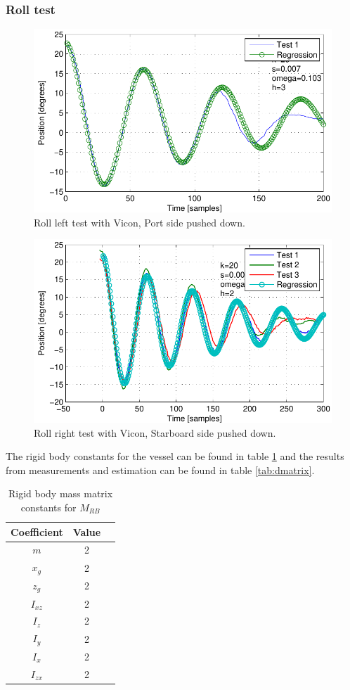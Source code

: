 \newpage
\subsubsection{Roll test}
\begin{figure}[H]
	\centering
	\includegraphics{plot/rltest}
	\caption{Roll left test with Vicon, Port side pushed down.}
	\label{fig:rltest}
\end{figure}
\begin{figure}[H]
	\centering
	\includegraphics{plot/rrtest}
	\caption{Roll right test with Vicon, Starboard side pushed down.}
	\label{fig:rrtest}
\end{figure}


The rigid body constants for the vessel can be found in table \ref{tab:constants} and the results from measurements and estimation can be found in table \ref{tab:dmatrix}.
\begin{table}[htbp]
\centering
\begin{tabular}{ccc}
	\toprule
  Coefficient & Value \\
  \midrule
  $m$ & 2 \\
  $x_g$ & 2 \\
  $z_g$ & 2\\
  $I_{xz}$ & 2 \\
  $I_z$ & 2 \\
  $I_y$ & 2 \\
  $I_x$ & 2 \\
  $I_{zx}$ & 2 \\
  \bottomrule
\end{tabular}
\caption{Rigid body mass matrix constants for $M_{RB}$}
\label{tab:constants}
\end{table}

